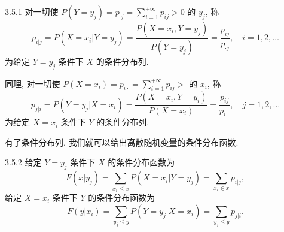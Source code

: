 	\begin{definition}{}{3.5.1}
		对一切使 $P\left(Y=y_{j}\right)=p_{ \cdot j}=\sum_{i=1}^{+\infty} p_{i j}>0$ 的 $y_j$, 称		
		\begin{equation}\label{eq:3.5.1}
			p_{i | j}=P\left(X=x_{i} | Y=y_{j}\right)=\frac{P\left(X=x_{i}, Y=y_{j}\right)}{P\left(Y=y_{j}\right)}
			=\frac{p_{i j}}{p_{\cdot j}}, \quad i=1,2, \ldots
		\end{equation}
		为给定 $Y=y_j$ 条件下 $X$ 的条件分布列.

		同理, 对一切使 $P\left(X=x_{i}\right)=p_{i\cdot} =\sum_{i=1}^{+\infty} p_{i j}>$ 的 $x_i$, 称
		\begin{equation}\label{eq:3.5.2}
		 	p_{j | i}=P\left(Y=y_{j} | X=x_{i}\right)=\frac{P\left(X=x_{i},
		 	Y=y_{i}\right)}{P\left(X=x_{i}\right)}=\frac{p_{i j}}{p_{i\cdot}}, \quad j=1,2, \ldots
		\end{equation}
		为给定 $X=x_i$ 条件下 $Y$ 的条件分布列.
	\end{definition}
	有了条件分布列, 我们就可以给出离散随机变量的条件分布函数.
	\begin{definition}{}{3.5.2}
		给定 $Y=y_j$ 条件下 $X$ 的条件分布函数为
		\begin{equation}\label{eq:3.5.3}
		 	F\left(x | y_{j}\right)=\sum_{x_{i} \leq x} P\left(X=x_{i} | Y=y_{j}\right)=\sum_{x_{i} \in x} p_{i | j},
		\end{equation}
		给定 $X=x_i$ 条件下 $Y$ 的条件分布函数为
		\begin{equation}\label{eq:3.5.4}
		 	F\left(y | x_{i}\right)=\sum_{y_{j} \leq  y} P\left(Y=y_{j} | X=x_{i}\right)=\sum_{y_{j} \leq  y} p_{j | i}.
		\end{equation}
	\end{definition}

